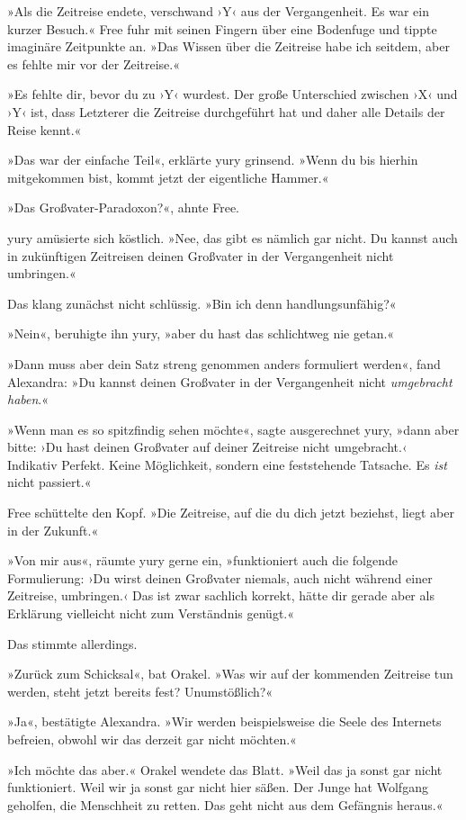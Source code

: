 »Als die Zeitreise endete, verschwand ›Y‹ aus der Vergangenheit. Es war ein kurzer Besuch.« Free fuhr mit seinen Fingern über eine Bodenfuge und tippte imaginäre Zeitpunkte an. »Das Wissen über die Zeitreise habe ich seitdem, aber es fehlte mir vor der Zeitreise.«

»Es fehlte dir, bevor du zu ›Y‹ wurdest. Der große Unterschied zwischen ›X‹ und ›Y‹ ist, dass Letzterer die Zeitreise durchgeführt hat und daher alle Details der Reise kennt.«

»Das war der einfache Teil«, erklärte yury grinsend. »Wenn du bis hierhin mitgekommen bist, kommt jetzt der eigentliche Hammer.«

»Das Großvater-Paradoxon?«, ahnte Free.

yury amüsierte sich köstlich. »Nee, das gibt es nämlich gar nicht. Du kannst auch in zukünftigen Zeitreisen deinen Großvater in der Vergangenheit nicht umbringen.«

Das klang zunächst nicht schlüssig. »Bin ich denn handlungsunfähig?«

»Nein«, beruhigte ihn yury, »aber du hast das schlichtweg nie getan.«

»Dann muss aber dein Satz streng genommen anders formuliert werden«, fand Alexandra: »Du kannst deinen Großvater in der Vergangenheit nicht \emph{umgebracht haben}.«

»Wenn man es so spitzfindig sehen möchte«, sagte ausgerechnet yury, »dann aber bitte: ›Du hast deinen Großvater auf deiner Zeitreise nicht umgebracht.‹ Indikativ Perfekt. Keine Möglichkeit, sondern eine feststehende Tatsache. Es \emph{ist} nicht passiert.«

Free schüttelte den Kopf. »Die Zeitreise, auf die du dich jetzt beziehst, liegt aber in der Zukunft.«

»Von mir aus«, räumte yury gerne ein, »funktioniert auch die folgende Formulierung: ›Du wirst deinen Großvater niemals, auch nicht während einer Zeitreise, umbringen.‹ Das ist zwar sachlich korrekt, hätte dir gerade aber als Erklärung vielleicht nicht zum Verständnis genügt.«

Das stimmte allerdings.

»Zurück zum Schicksal«, bat Orakel. »Was wir auf der kommenden Zeitreise tun werden, steht jetzt bereits fest? Unumstößlich?«

»Ja«, bestätigte Alexandra. »Wir werden beispielsweise die Seele des Internets befreien, obwohl wir das derzeit gar nicht möchten.«

»Ich möchte das aber.« Orakel wendete das Blatt. »Weil das ja sonst gar nicht funktioniert. Weil wir ja sonst gar nicht hier säßen. Der Junge hat Wolfgang geholfen, die Menschheit zu retten. Das geht nicht aus dem Gefängnis heraus.«

